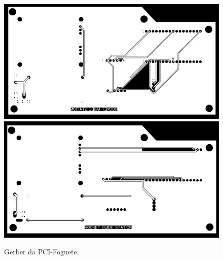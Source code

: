 \begin{figure}[H]
  \centering
  \includegraphics[scale=0.4]{Figuras/pci fabric/gerber foguete bottomlayer.png}
    \includegraphics[scale=0.4]{Figuras/pci fabric/gerber foguete toplayer.png}
  \caption{Gerber da PCI-Foguete.}
  \label{fig:Gerber da PCI-Foguete}
\end{figure}

